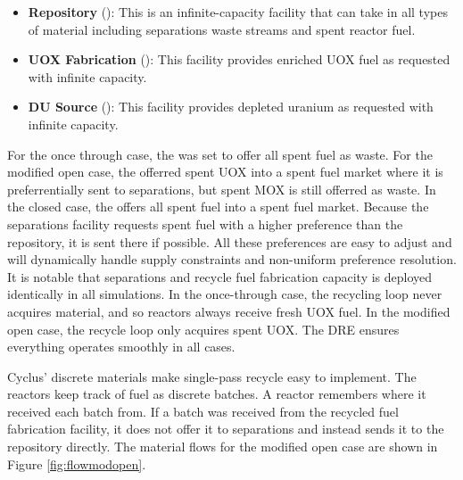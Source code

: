 \begin{itemize}
    \item \textbf{Repository} (): This is an
        infinite-capacity facility that can take in all types of material
        including separations waste streams and spent reactor fuel.

    \item \textbf{UOX Fabrication} (): This facility
        provides enriched UOX fuel as requested with infinite capacity.

    \item \textbf{DU Source} (): This facility provides
        depleted uranium as requested with infinite capacity.

\end{itemize}

For the once through case, the  was set to offer all spent fuel
as waste.  For the modified open case, the  offerred spent UOX
into a spent fuel market where it is preferrentially sent to separations, but
spent MOX is still offerred as waste.  In the closed case, the 
offers all spent fuel into a spent fuel market. Because the separations
facility requests spent fuel with a higher preference than the repository, it
is sent there if possible.  All these preferences are easy to adjust and
\Cyclus will dynamically handle supply constraints and non-uniform preference
resolution.  It is notable that separations and recycle fuel fabrication
capacity is deployed identically in all simulations.  In the once-through
case, the recycling loop never acquires material, and so reactors always
receive fresh UOX fuel.  In the modified open case, the recycle loop only
acquires spent UOX.  The \gls{DRE} ensures everything operates smoothly in all
cases.

Cyclus' discrete materials make single-pass recycle easy to implement.  The
reactors keep track of fuel as discrete batches. A reactor remembers where it
received each batch from.  If a batch was received from the recycled fuel
fabrication facility, it does not offer it to separations and instead sends it
to the repository directly.  The material flows for the modified open case are
shown in Figure \ref{fig:flowmodopen}.

